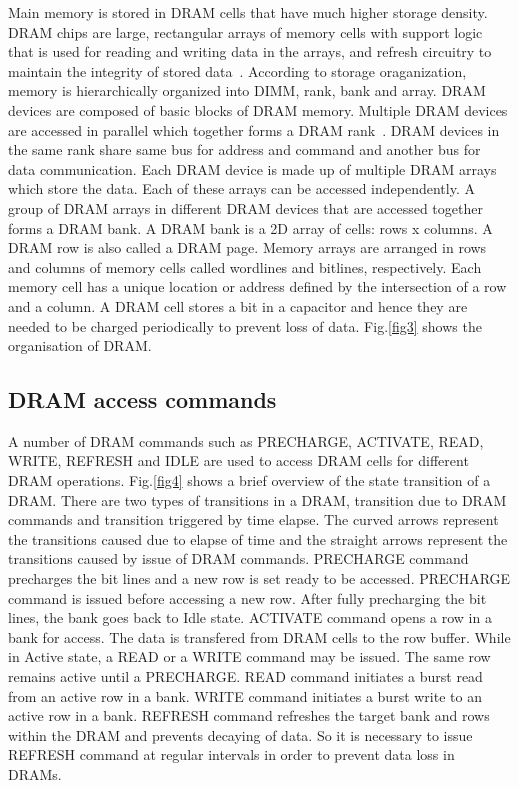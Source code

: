 \noindent
Main memory is stored in DRAM cells that have much higher storage density. DRAM chips are large, rectangular arrays of memory 
cells with support logic that is used for reading and writing data in the arrays, and refresh circuitry to maintain the 
integrity of stored data~\cite{wiki:xxx1}. According to storage oraganization, memory is hierarchically organized into DIMM, 
rank, bank and array. DRAM devices are composed of basic blocks of DRAM memory. Multiple DRAM devices are accessed in parallel 
which together forms a DRAM rank~\cite{Rixner:2000:MAS:342001.339668}. DRAM devices in the same rank share same bus for 
address and command and another bus for data communication. Each DRAM device is made up of multiple DRAM arrays which store 
the data. Each of these arrays can be accessed independently. A group of DRAM arrays in different DRAM devices that are 
accessed together forms a DRAM bank. A DRAM bank is a 2D array of cells: rows x columns. A DRAM row is also called a DRAM 
page. Memory arrays are arranged in rows and columns of memory cells called wordlines and bitlines, respectively. Each memory 
cell has a unique location or address defined by the intersection of a row and a column. A DRAM cell stores a bit in a 
capacitor and hence they are needed to be charged periodically to prevent loss of data. Fig.\ref{fig3} shows the 
organisation of DRAM.

\subsection{DRAM access commands}\label{b2}
\noindent
A number of DRAM commands such as PRECHARGE, ACTIVATE, READ, WRITE, REFRESH and IDLE are used to access DRAM cells for 
different DRAM operations. Fig.\ref{fig4} shows a brief overview of the state transition of a DRAM. There are two types of 
transitions in a DRAM, transition due to DRAM commands and transition triggered by time elapse. The curved arrows represent 
the transitions caused due to elapse of time and the straight arrows represent the transitions caused by issue of DRAM 
commands.
PRECHARGE command precharges the bit lines and a new row is set ready to be accessed. PRECHARGE command is issued before 
accessing a new row. After fully precharging the bit lines, the bank goes back to Idle state.
ACTIVATE command opens a row in a bank for access. The data is transfered from DRAM cells to the row buffer. While in Active 
state, a READ or a WRITE command may be issued. The same row remains active until a PRECHARGE. 
READ command initiates a burst read from an active row in a bank.
WRITE command initiates a burst write to an active row in a bank.
REFRESH command refreshes the target bank and rows within the DRAM and prevents decaying of data. So it is necessary to 
issue REFRESH command at regular intervals in order to prevent data loss in DRAMs.

